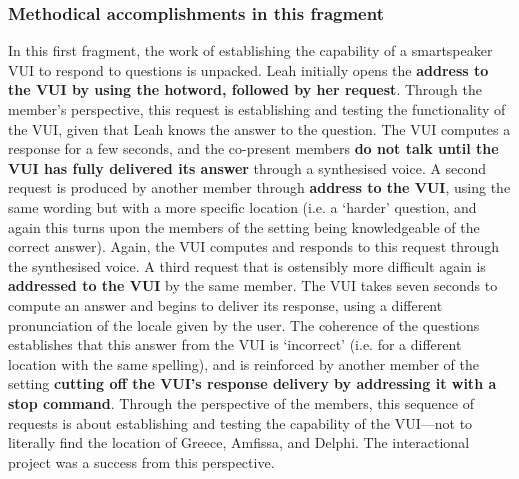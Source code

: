 


\crpagebreak\subsubsection{Methodical accomplishments in this fragment}\label{sec:empirical home findings capability methods}
\begin{revisedsubmission}
In this first fragment, the work of establishing the capability of a smartspeaker \ac{VUI} to respond to  questions is unpacked.
Leah initially opens the \textbf{address to the \ac{VUI} by using the hotword, followed by her request}.
Through the member's perspective, this request is establishing and testing the functionality of the \ac{VUI}, given that Leah knows the answer to the question.
The \ac{VUI} computes a response for a few seconds, and the co-present members \textbf{do not talk until the \ac{VUI} has fully delivered its answer} through a synthesised voice.
A second request is produced by another member through \textbf{address to the \ac{VUI}}, using the same wording but with a more specific location (i.e. a `harder' question, and again this turns upon the members of the setting being knowledgeable of the correct answer).
Again, the \ac{VUI} computes and responds to this request through the synthesised voice.
A third request that is ostensibly more difficult again is \textbf{addressed to the \ac{VUI}} by the same member.
The \ac{VUI} takes seven seconds to compute an answer and begins to deliver its response, using a different pronunciation of the locale given by the user.
The coherence of the questions establishes that this answer from the \ac{VUI} is `incorrect' (i.e. for a different location with the same spelling), and is reinforced by another member of the setting \textbf{cutting off the \ac{VUI}'s response delivery by addressing it with a stop command}.
Through the perspective of the members, this sequence of requests is about establishing and testing the capability of the \ac{VUI}---not to literally find the location of Greece, Amfissa, and Delphi.
The interactional project was a success from this perspective.
\end{revisedsubmission}






